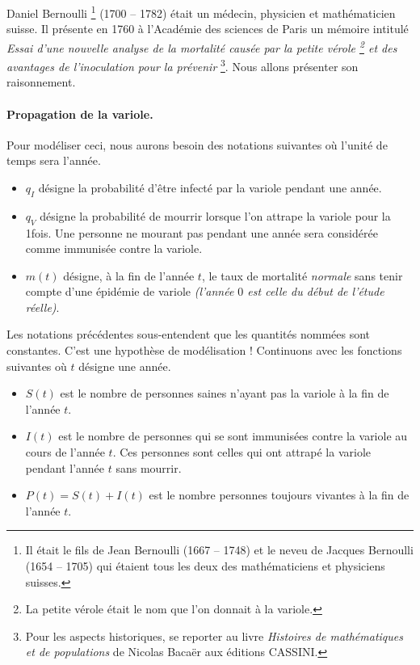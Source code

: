 Daniel Bernoulli
\footnote{
	Il était le fils de Jean Bernoulli (1667 -- 1748) et le neveu de Jacques Bernoulli (1654 -- 1705) qui étaient tous les deux des mathématiciens et physiciens suisses.
}
(1700 -- 1782) était un médecin, physicien et mathématicien suisse. Il présente en 1760 à l'Académie des sciences de Paris un mémoire intitulé \emph{\og Essai d'une nouvelle analyse de la mortalité causée par la petite vérole
\footnote{
	La petite vérole était le nom que l'on donnait à la variole.
}
et des avantages de l'inoculation pour la prévenir \fg}
\footnote{
	Pour les aspects historiques, se reporter au livre \emph{\og Histoires de mathématiques et de populations \fg} de Nicolas Bacaër aux éditions CASSINI.
}.
Nous allons présenter son raisonnement.




\paragraph{Propagation de la variole.} Pour modéliser ceci, nous aurons besoin des notations suivantes où l'unité de temps sera l'année.

\begin{itemize}[label=\small\textbullet]
	\item $q_I$ désigne la probabilité d'être infecté par la variole pendant une année.

	\item $q_V$ désigne la probabilité de mourrir lorsque l'on attrape la variole pour la 1\iere fois. Une personne ne mourant pas pendant une année sera considérée comme immunisée contre la variole.

	\item $m(t)$ désigne, à la fin de l'année $t$, le taux de mortalité \emph{\og normale \fg} sans tenir compte d'une épidémie de variole \emph{(l'année $0$ est celle du début de l'étude réelle)}. 
\end{itemize}

Les notations précédentes sous-entendent que les quantités nommées sont constantes. C'est une hypothèse de modélisation ! Continuons avec les fonctions suivantes où $t$ désigne une année.

\begin{itemize}[label=\small\textbullet]
	\item $S(t)$ est le nombre de personnes saines n'ayant pas la variole à la fin de l'année $t$.

	\item $I(t)$ est le nombre de personnes qui se sont immunisées contre la variole au cours de l'année $t$. Ces personnes sont celles qui ont attrapé la variole pendant l'année $t$ sans   mourrir.

	\item $P(t) = S(t) + I(t)$ est le nombre personnes toujours vivantes à la fin de l'année $t$. 
\end{itemize}


